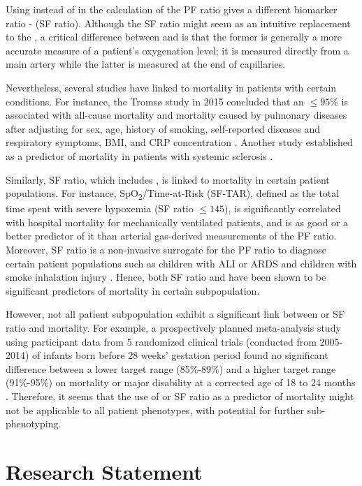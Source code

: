 Using \Sp instead of \Pa in the calculation of the PF ratio gives a different biomarker ratio - \SF (SF ratio). Although the SF ratio might seem as an intuitive replacement to the \PF, a critical difference between \Pa and \Sp is that the former is generally a more accurate measure of a patient's oxygenation level; it is measured directly from a main artery while the latter is measured at the end of capillaries. 

Nevertheless, several studies have linked \Sp to mortality in patients with certain conditions. For instance, the Tromsø study in 2015 concluded that an \Sp $\leq95\%$ is associated with all-cause mortality and mortality caused by pulmonary diseases after adjusting for sex, age, history of smoking, self-reported diseases and respiratory symptoms, BMI, and CRP concentration \citep{vold2015low}. Another study established \Sp as a predictor of mortality in patients with systemic sclerosis  \citep{swigris2009exercise}. 

Similarly, SF ratio, which includes \Sp, is linked to mortality in certain patient populations. For instance, SpO\textsubscript{2}/\Fi Time-at-Risk (SF-TAR), defined as the total time spent with severe hypoxemia (SF ratio $\leq 145$), is  significantly correlated with hospital mortality for mechanically ventilated patients, and is as good or a better predictor of it than arterial gas-derived measurements of the PF ratio. Moreover, SF ratio is a non-invasive surrogate for the PF ratio to diagnose certain patient populations such as children with ALI or ARDS \citep{rice2007comparison} and children with smoke inhalation injury \citep{cambiaso2017correlation}. Hence, both SF ratio and \Sp have been shown to be significant predictors of mortality in certain subpopulation. 

However, not all patient subpopulation exhibit a significant link between \Sp or SF ratio and mortality. For example, a prospectively planned meta-analysis study using participant data from 5 randomized clinical trials (conducted from 2005-2014) of infants born before 28 weeks' gestation period found no significant difference between a lower \Sp target range (85\%-89\%) and a higher \Sp target range (91\%-95\%) on mortality or major disability at a corrected age of 18 to 24 months \citep{askie2018association}. Therefore, it seems that the use of \Sp or SF ratio as a predictor of mortality might not be applicable to all patient phenotypes, with potential for further sub-phenotyping. 


\section{Research Statement} 

